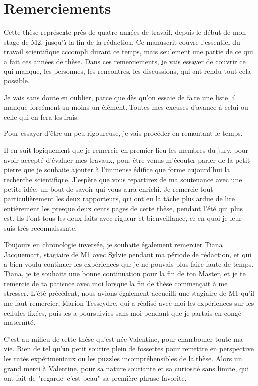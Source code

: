 \chapter*{Remerciements}
Cette thèse représente près de quatre années de travail, depuis le début de mon stage de M2, jusqu'à la fin de la rédaction. Ce manuscrit couvre l'essentiel du travail scientifique accompli durant ce temps, mais seulement une partie de ce qui a fait ces années de thèse. Dans ces remerciements, je vais essayer de couvrir ce qui manque, les personnes, les rencontres, les discussions, qui ont rendu tout cela possible. 

Je vais sans doute en oublier, parce que dès qu'on essaie de faire une liste, il manque forcément au moins un élément. Toutes mes excuses d'avance à celui ou celle qui en fera les frais. 

Pour essayer d'être un peu rigoureuse, je vais procéder en remontant le temps. 

Il en suit logiquement que je remercie en premier lieu les membres du jury, pour avoir accepté d'évaluer mes travaux, pour être venus m'écouter parler de la petit pierre que je souhaite ajouter à l'immense édifice que forme aujourd'hui la recherche scientifique. 
J'espère que vous repartirez de ma soutenance avec une petite idée, un bout de savoir qui vous aura enrichi. 
Je remercie tout particulièrement les deux rapporteurs, qui ont eu la tâche plus ardue de lire entièrement les presque deux cents pages de cette thèse, pendant l'été qui plus est. Ils l'ont tous les deux faits avec rigueur et bienveillance, ce en quoi je leur suis très reconnaissante.

Toujours en chronologie inversée, je souhaite également remercier Tiana Jacquemart, stagiaire de M1 avec Sylvie pendant ma période de rédaction, et qui a bien voulu continuer les expériences que je ne pouvais plus faire faute de temps. Tiana, je te souhaite une bonne continuation pour la fin de ton Master, et je te remercie de ta patience avec moi lorsque la fin de thèse commençait à me stresser. 
L'été précédent, nous avions également accueilli une stagiaire de M1 qu'il me faut remercier, Marion Tesseydre, qui a réalisé avec moi les expériences sur les cellules fixées, puis les a poursuivies sans moi pendant que je partais en congé maternité.         

C'est au milieu de cette thèse qu'est née Valentine, pour chambouler toute ma vie. Rien de tel qu'un petit sourire plein de fossettes pour remettre en perspective les ratés expérimentaux ou les puzzles incompréhensibles de la thèse. Alors un grand merci à Valentine, pour sa nature souriante et sa curiosité sans limite, qui ont fait de "regarde, c'est beau" sa première phrase favorite. 

